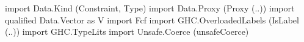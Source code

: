 \begin{code}
import Data.Kind (Constraint, Type)
import Data.Proxy (Proxy (..))
import qualified Data.Vector as V
import Fcf
import GHC.OverloadedLabels (IsLabel (..))
import GHC.TypeLits
import Unsafe.Coerce (unsafeCoerce)
\end{code}
